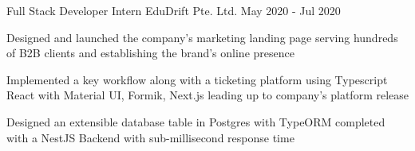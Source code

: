 \begin{cventries}
  \cventry
    {Full Stack Developer Intern} %
    {EduDrift Pte. Ltd.} %
    {} %
    {May 2020 - Jul 2020} %
    {
      \begin{cvitems} %
        \item {Designed and launched the company's marketing landing page serving hundreds of B2B clients and establishing the brand's online presence}
        \item {Implemented a key workflow along with a ticketing platform using Typescript React with Material UI, Formik, Next.js leading up to company's platform release}
        \item {Designed an extensible database table in Postgres with TypeORM completed with a NestJS Backend with sub-millisecond response time}
      \end{cvitems}
    }

\end{cventries}
